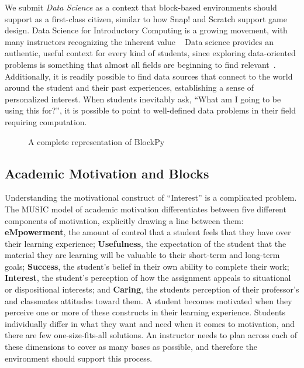 \documentclass{sig-alternate}
\begin{document}
We submit \textit{Data Science} as a context that block-based environments should support as a first-class citizen, similar to how Snap! and Scratch support game design.
Data Science for Introductory Computing is a growing movement, with many instructors recognizing the inherent value ~\cite{Anderson, Sullivan:2013}
Data science provides an authentic, useful context for every kind of students, since exploring data-oriented problems is something that almost all fields are beginning to find relevant~\cite{Layman:2007, Social-good}.
Additionally, it is readily possible to find data sources that connect to the world around the student and their past experiences, establishing a sense of personalized interest.
When students inevitably ask, ``What am I going to be using this for?'', it is possible to point to well-defined data problems in their field requiring computation.

\begin{figure*}[t]
\caption{A complete representation of BlockPy}
\label{fig-blockpy-full}
\end{figure*}

\subsection{Academic Motivation and Blocks}

Understanding the motivational construct of ``Interest'' is a complicated problem. The MUSIC model of academic motivation\cite{jones-description} differentiates between five different components of motivation, explicitly drawing a line between them: \textbf{eMpowerment}, the amount of control that a student feels that they have over their learning experience; \textbf{Usefulness}, the expectation of the student that the material they are learning will be valuable to their short-term and long-term goals; \textbf{Success}, the student's belief in their own ability to complete their work; \textbf{Interest}, the student's perception of how the assignment appeals to situational or dispositional interests; and \textbf{Caring}, the students perception of their professor's and classmates attitudes toward them.
A student becomes motivated when they perceive one or more of these constructs in their learning experience.
Students individually differ in what they want and need when it comes to motivation, and there are few one-size-fits-all solutions.
An instructor needs to plan across each of these dimensions to cover as many bases as possible, and therefore the environment should support this process.
\end{document}
